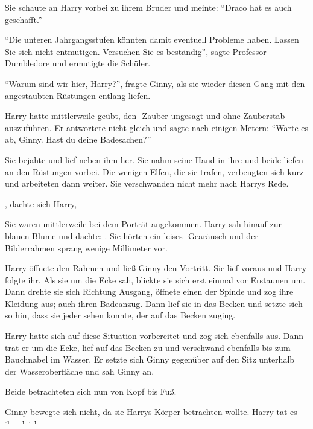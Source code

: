 Sie schaute an Harry vorbei zu ihrem Bruder und meinte: \enquote{Draco hat es auch geschafft.}

\enquote{Die unteren Jahrgangsstufen könnten damit eventuell Probleme haben. Lassen Sie sich nicht entmutigen. Versuchen Sie es beständig}, sagte Professor Dumbledore und ermutigte die Schüler.

\trenn

\enquote{Warum sind wir hier, Harry?}, fragte Ginny, als sie wieder diesen Gang mit den angestaubten Rüstungen entlang liefen.

Harry hatte mittlerweile geübt, den -Zauber ungesagt und ohne Zauberstab auszuführen. Er antwortete nicht gleich und sagte nach einigen Metern: \enquote{Warte es ab, Ginny. Hast du deine Badesachen?}

Sie bejahte und lief neben ihm her. Sie nahm seine Hand in ihre und beide liefen an den Rüstungen vorbei. Die wenigen Elfen, die sie trafen, verbeugten sich kurz und arbeiteten dann weiter. Sie verschwanden nicht mehr nach Harrys Rede.

, dachte sich Harry, 

Sie waren mittlerweile bei dem Porträt angekommen. Harry sah hinauf zur blauen Blume und dachte: . Sie hörten ein leises -Gearäusch und der Bilderrahmen sprang wenige Millimeter vor.

Harry öffnete den Rahmen und ließ Ginny den Vortritt. Sie lief voraus und Harry folgte ihr. Als sie um die Ecke sah, blickte sie sich erst einmal vor Erstaunen um. Dann drehte sie sich Richtung Ausgang, öffnete einen der Spinde und zog ihre Kleidung aus; auch ihren Badeanzug. Dann lief sie in das Becken und setzte sich so hin, dass sie jeder sehen konnte, der auf das Becken zuging.

Harry hatte sich auf diese Situation vorbereitet und zog sich ebenfalls aus. Dann trat er um die Ecke, lief auf das Becken zu und verschwand ebenfalls bis zum Bauchnabel im Wasser. Er setzte sich Ginny gegenüber auf den Sitz unterhalb der Wasseroberfläche und sah Ginny an.

Beide betrachteten sich nun von Kopf bis Fuß. 

Ginny bewegte sich nicht, da sie Harrys Körper betrachten wollte. Harry tat es ihr gleich.

